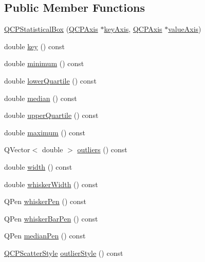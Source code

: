 \subsection*{Public Member Functions}
\begin{DoxyCompactItemize}
\item 
\hyperlink{classQCPStatisticalBox_a75c2b3e7fcd0741cc981693a2ba63b27}{Q\+C\+P\+Statistical\+Box} (\hyperlink{classQCPAxis}{Q\+C\+P\+Axis} $\ast$\hyperlink{classQCPAbstractPlottable_a72c7a09c22963f2c943f07112b311103}{key\+Axis}, \hyperlink{classQCPAxis}{Q\+C\+P\+Axis} $\ast$\hyperlink{classQCPAbstractPlottable_a3106f9d34d330a6097a8ec5905e5b519}{value\+Axis})
\item 
double \hyperlink{classQCPStatisticalBox_a767af754f39872d6308b900a0d1758ca}{key} () const 
\item 
double \hyperlink{classQCPStatisticalBox_acd94c05d59c05d9146d3b60d9f52df82}{minimum} () const 
\item 
double \hyperlink{classQCPStatisticalBox_af9c4a98f5ca95b5a5a8b140f57b64ace}{lower\+Quartile} () const 
\item 
double \hyperlink{classQCPStatisticalBox_a44abdee617fe0bca72e6a2ea3fd492de}{median} () const 
\item 
double \hyperlink{classQCPStatisticalBox_abd15951907b54343a89b1f7feddcb7a7}{upper\+Quartile} () const 
\item 
double \hyperlink{classQCPStatisticalBox_a928bcf07dd2176affad91d85be03172f}{maximum} () const 
\item 
Q\+Vector$<$ double $>$ \hyperlink{classQCPStatisticalBox_a73eaa2f800b47e3832d7f09ad1f3b7e0}{outliers} () const 
\item 
double \hyperlink{classQCPStatisticalBox_a0733a7bd575fc5929ce6d507bcc2a04c}{width} () const 
\item 
double \hyperlink{classQCPStatisticalBox_ab02392dd54ebd6dd7c8d6fb5c3f0421c}{whisker\+Width} () const 
\item 
Q\+Pen \hyperlink{classQCPStatisticalBox_a26d2b34cbaeac2dd639bb21590f317c4}{whisker\+Pen} () const 
\item 
Q\+Pen \hyperlink{classQCPStatisticalBox_ab151a727fb0b6396acb3b6c72505a4fe}{whisker\+Bar\+Pen} () const 
\item 
Q\+Pen \hyperlink{classQCPStatisticalBox_a96aa0bb650b83e9dfa0387ca4db7fa05}{median\+Pen} () const 
\item 
\hyperlink{classQCPScatterStyle}{Q\+C\+P\+Scatter\+Style} \hyperlink{classQCPStatisticalBox_ab7e5a68bce97ba43a7ff18e074c4dcad}{outlier\+Style} () const 

\end{DoxyCompactItemize}
